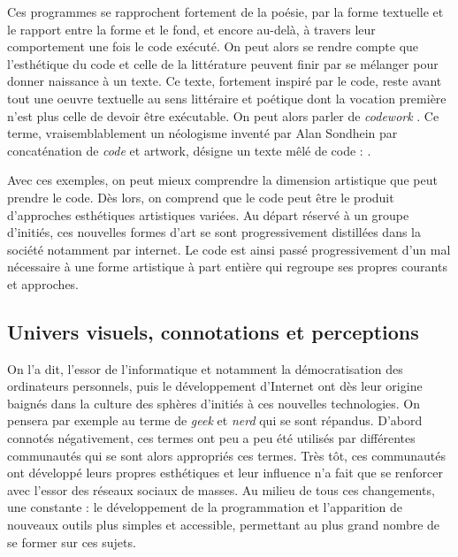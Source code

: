 \documentclass[12pt]{article} %
\begin{document}
Ces programmes se rapprochent fortement de la poésie, par la forme textuelle et le rapport entre la forme et le fond, et encore au-delà, à travers leur comportement une fois le code exécuté. On peut alors se rendre compte que l'esthétique du code et celle de la littérature peuvent finir par se mélanger pour donner naissance à un texte. Ce texte, fortement inspiré par le code, reste avant tout une oeuvre textuelle au sens littéraire et poétique dont la vocation première n'est plus celle de devoir être exécutable. On peut alors parler de \textit{codework} \label{codework}. Ce terme, vraisemblablement un néologisme inventé par Alan Sondhein par concaténation de \textit{code} et {artwork}, désigne un texte mêlé de code :  \cite{ELO-ContentByKeyword}. 



Avec ces exemples, on peut mieux comprendre la dimension artistique que peut prendre le code. Dès lors, on comprend que le code peut être le produit d'approches esthétiques artistiques variées. Au départ réservé à un groupe d'initiés, ces nouvelles formes d'art se sont progressivement distillées dans la société notamment par internet. Le code est ainsi passé progressivement d'un mal nécessaire à une forme artistique à part entière qui regroupe ses propres courants et approches.

\subsection{Univers visuels, connotations et perceptions}
On l'a dit, l'essor de l'informatique et notamment la démocratisation des ordinateurs personnels, puis le développement d'Internet ont dès leur origine baignés dans la culture des sphères d'initiés à ces nouvelles technologies. On pensera par exemple au terme de \textit{geek} et \textit{nerd} qui se sont répandus. D'abord connotés négativement, ces termes ont peu a peu été utilisés par différentes communautés qui se sont alors appropriés ces termes. Très tôt, ces communautés ont développé leurs propres esthétiques et leur influence n'a fait que se renforcer avec l'essor des réseaux sociaux de masses. Au milieu de tous ces changements, une constante : le développement de la programmation et l'apparition de nouveaux outils plus simples et accessible, permettant au plus grand nombre de se former sur ces sujets.
\end{document}
